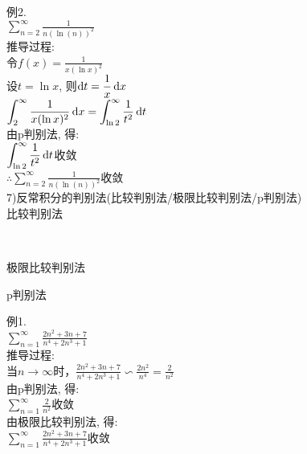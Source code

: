 例2.\\
\phantom{例}$\displaystyle\sum_{n=2}^\infty\frac{1}{n(\ln(n))^2}$\\
推导过程:\\
令$\displaystyle f(x)=\frac{1}{x(\ln x)^2}$\\
设$t=\ln x$, 则$\displaystyle\mathop{}\!\mathrm{d} t=\frac{1}{x}\mathop{}\!\mathrm{d} x$\\
$\displaystyle\int_2^{\infty}\frac{1}{x(\ln x)^2}\mathop{}\!\mathrm{d} x=\int_{\ln 2}^{\infty}\frac{1}{t^2}\mathop{}\!\mathrm{d} t$\\
由p判别法, 得:\\
$\displaystyle\int_{\ln 2}^{\infty}\frac{1}{t^2}\mathop{}\!\mathrm{d} t$收敛\\
$\therefore\displaystyle\sum_{n=2}^{\infty}\frac{1}{n(\ln(n))^2}$收敛\\[1ex]


7)反常积分的判别法(比较判别法/极限比较判别法/p判别法)\\
比较判别法
{\par\centering
{}\\[1ex]
\par}\vspace{4ex}

极限比较判别法
{\par\centering
{}
\par}\vspace{4ex}

p判别法
{\par\centering
{}
\par}\vspace{4ex}

例1.\\
\phantom{例}$\displaystyle\sum_{n=1}^{\infty}\frac{2n^2+3n+7}{n^4+2n^3+1}$\\
推导过程:\\
当$n\to\infty$时，$\displaystyle\frac{2n^2+3n+7}{n^4+2n^3+1}\backsim\frac{2n^2}{n^4}=\frac{2}{n^2}$\\
由p判别法, 得:\\
$\displaystyle\sum_{n=1}^{\infty}\frac{2}{n^2}$收敛\\
由极限比较判别法, 得:\\
$\displaystyle\sum_{n=1}^{\infty}\frac{2n^2+3n+7}{n^4+2n^3+1}$收敛\\[1ex]

